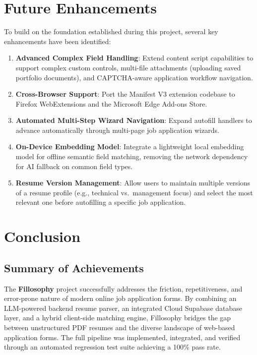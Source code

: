 \documentclass[12pt,a4paper]{report}
\begin{document}
\chapter{Future Enhancements}

To build on the foundation established during this project, several key enhancements have been identified:

\begin{enumerate}
    \item \textbf{Advanced Complex Field Handling}: Extend content script capabilities to support complex custom controls, multi-file attachments (uploading saved portfolio documents), and CAPTCHA-aware application workflow navigation.
    \item \textbf{Cross-Browser Support}: Port the Manifest V3 extension codebase to Firefox WebExtensions and the Microsoft Edge Add-ons Store.
    \item \textbf{Automated Multi-Step Wizard Navigation}: Expand autofill handlers to advance automatically through multi-page job application wizards.
    \item \textbf{On-Device Embedding Model}: Integrate a lightweight local embedding model for offline semantic field matching, removing the network dependency for AI fallback on common field types.
    \item \textbf{Resume Version Management}: Allow users to maintain multiple versions of a resume profile (e.g., technical vs.\ management focus) and select the most relevant one before autofilling a specific job application.
\end{enumerate}

\chapter{Conclusion}

\section{Summary of Achievements}
The \textbf{Fillosophy} project successfully addresses the friction, repetitiveness, and error-prone nature of modern online job application forms. By combining an LLM-powered backend resume parser, an integrated Cloud Supabase database layer, and a hybrid client-side matching engine, Fillosophy bridges the gap between unstructured PDF resumes and the diverse landscape of web-based application forms. The full pipeline was implemented, integrated, and verified through an automated regression test suite achieving a 100\% pass rate.
\end{document}
